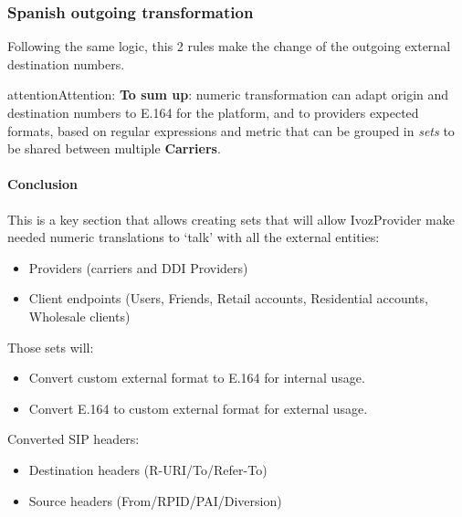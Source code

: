 \documentclass[letterpaper,10pt,english]{sphinxmanual}
\begin{document}
\subsubsection{Spanish outgoing transformation}
\label{administration_portal/brand/settings/numeric_transformations:spanish-outgoing-transformation}
Following the same logic, this 2 rules make the change of the outgoing external
destination numbers.

\begin{notice}{attention}{Attention:}
\textbf{To sum up}: numeric transformation can adapt origin and
destination numbers to E.164 for the platform, and to providers expected
formats, based on regular expressions and metric that can be grouped in \emph{sets}
to be shared between multiple \textbf{Carriers}.
\end{notice}


\paragraph{Conclusion}
\label{administration_portal/brand/settings/numeric_transformations:conclusion}
This is a key section that allows creating sets that will allow IvozProvider make needed numeric translations to `talk'
with all the external entities:
\begin{itemize}
\item {} 
Providers (carriers and DDI Providers)

\item {} 
Client endpoints (Users, Friends, Retail accounts, Residential accounts, Wholesale clients)

\end{itemize}

Those sets will:
\begin{itemize}
\item {} 
Convert custom external format to E.164 for internal usage.

\item {} 
Convert E.164 to custom external format for external usage.

\end{itemize}

Converted SIP headers:
\begin{itemize}
\item {} 
Destination headers (R-URI/To/Refer-To)

\item {} 
Source headers (From/RPID/PAI/Diversion)

\end{itemize}
\end{document}
